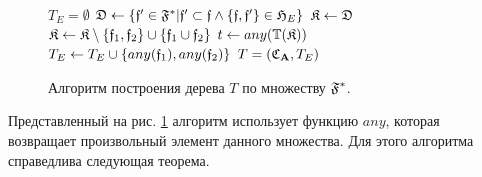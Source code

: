 \begin{figure}[htb!]
\begin{algorithmic}[1]
\STATE $T_E = \emptyset$
\FORALL{$\gf \in \gFs$}
    \STATE $\mathfrak{D} \gets \{\mathfrak{f}' \in \mathfrak{F}^* | \mathfrak{f}' \subset \mathfrak{f} \wedge \{\mathfrak{f}, \mathfrak{f}'\} \in \mathfrak{H}_E\}$
    \STATE $\mathfrak{K} \gets \mathfrak{D}$
        \STATE $\mathfrak{K} \gets \mathfrak{K} \setminus \{\mathfrak{f}_1, \mathfrak{f}_2\} \cup \{\mathfrak{f}_1 \cup \mathfrak{f}_2\}$
    \ENDWHILE
    \STATE $t \gets any(\mathbb{T}(\mathfrak{K}))$
        \STATE $T_E \gets T_E \cup \{any(\mathfrak{f}_1), any(\mathfrak{f}_2)\}$
    \ENDFOR
\ENDFOR
\RETURN $T = (\mathfrak{C}_{\mathbf{A}}, T_E)$
\end{algorithmic}
\caption{Алгоритм построения дерева $T$ по множеству $\mathfrak{F}^*$.}
\label{alg:build_tree}
\end{figure}

Представленный на рис. \ref{alg:build_tree} алгоритм использует функцию $any$, которая возвращает произвольный элемент данного множества. Для этого алгоритма справедлива следующая теорема.



